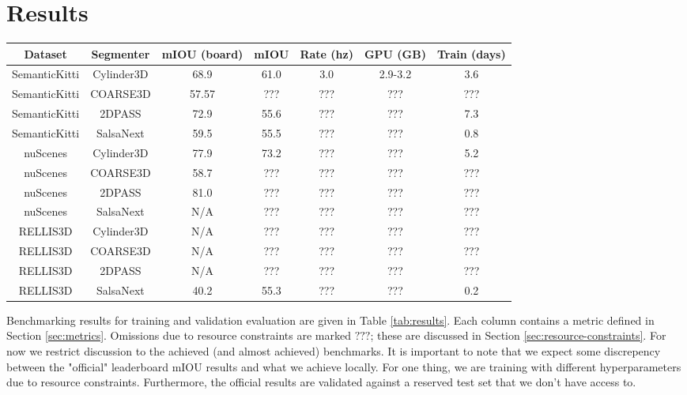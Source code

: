 \section{Results}
\label{chap:results}

\begin{center}
\begin{tabular}{ |c|c|c|c|c|c|c| }
 \hline
 Dataset & Segmenter & mIOU (board) & mIOU & Rate (hz) & GPU (GB) & Train (days) \\
 \hline
  SemanticKitti & Cylinder3D & 68.9 \cite{semantickittileaderboard} & 61.0 & 3.0 & 2.9-3.2 & 3.6 \\
  SemanticKitti & COARSE3D & 57.57 \cite{coarse3dgithub} & ???  & ??? & ??? & ??? \\
  SemanticKitti & 2DPASS & 72.9 \cite{semantickittileaderboard} & 55.6  & ??? & ??? & 7.3 \\
  SemanticKitti & SalsaNext & 59.5 \cite{semantickittileaderboard} & 55.5  & ??? & ??? & 0.8 \\
  nuScenes & Cylinder3D & 77.9 \cite{cylinder3dgithub} & 73.2 & ??? & ??? & 5.2 \\
  nuScenes & COARSE3D & 58.7 \cite{coarse3dgithub} & ??? & ??? &  ??? & ??? \\
  nuScenes & 2DPASS & 81.0 \cite{nuscenesleaderboard} & ??? & ??? &  ??? & ??? \\
  nuScenes & SalsaNext & N/A & ??? &  ??? & ??? & ??? \\
  RELLIS3D & Cylinder3D & N/A & ??? &  ??? & ??? & ??? \\
  RELLIS3D & COARSE3D & N/A & ??? &  ??? & ??? & ??? \\
  RELLIS3D & 2DPASS & N/A & ??? & ??? & ??? & ??? \\
  RELLIS3D & SalsaNext & 40.2 \cite{rellis3dgithub} & 55.3 &  ??? & ??? & 0.2 \\
 \hline
\end{tabular}
\label{tab:results}
\end{center}

Benchmarking results for training and validation evaluation are given in Table \ref{tab:results}. Each column contains a metric defined in Section \ref{sec:metrics}. Omissions due to resource constraints are marked $???$; these are discussed in Section \ref{sec:resource-constraints}. For now we restrict discussion to the achieved (and almost achieved) benchmarks. It is important to note that we expect some discrepency between the "official" leaderboard mIOU results and what we achieve locally. For one thing, we are training with different hyperparameters due to resource constraints. Furthermore, the official results are validated against a reserved test set that we don't have access to.


